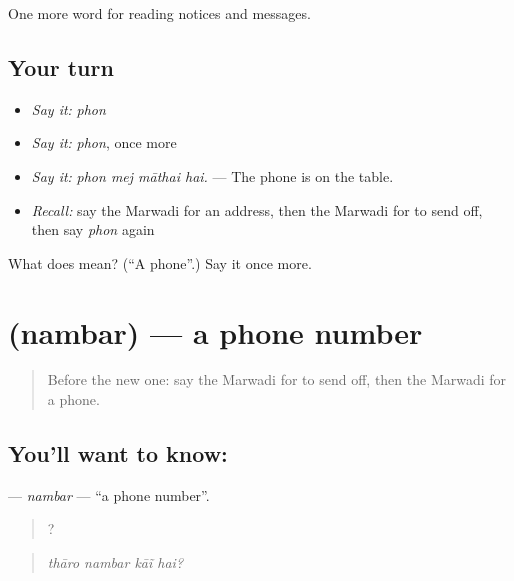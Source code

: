 \begin{grammarlens}[title={What you've built}]
One more word for reading notices and messages.
\end{grammarlens}

\subsection*{Your turn}
\begin{itemize}
\raggedright
  \item \emph{Say it:} \emph{phon}
  \item \emph{Say it:} \emph{phon}, once more
  \item \emph{Say it:} \emph{phon mej māthai hai.} — The phone is on the table.
  \item \emph{Recall:} say the Marwadi for an address, then the Marwadi for to send off, then say \emph{phon} again
\end{itemize}

\begin{tcolorbox}[breakable,colback=teal!4,colframe=teal!35!black,title={Before you move on}]
What does  mean? (\textquotedblleft{}A phone\textquotedblright{}.) Say it once more.
\end{tcolorbox}
\section[\texorpdfstring{\mw{नंबर} (nambar)}{नंबर (nambar)}]{ (nambar) — a phone number}

\label{lesson:MW-C197-nambar}



\begin{quote}
Before the new one: say the Marwadi for to send off, then the Marwadi for a phone.
\end{quote}

\subsection*{You'll want to know: }
\textbf{} — \emph{nambar} — \textquotedblleft{}a phone number\textquotedblright{}.

\begin{quote}
   ?
\end{quote}

\begin{quote}
\emph{thāro nambar kāĩ hai?}
\end{quote}

